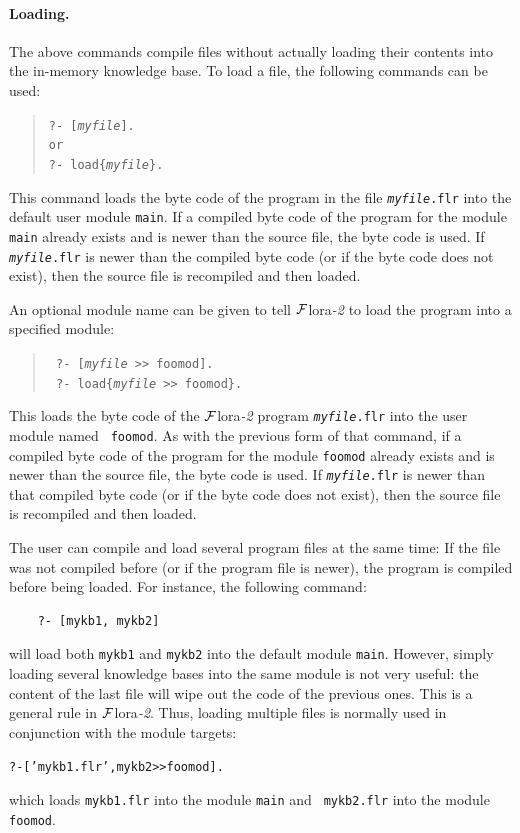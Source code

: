 \documentclass[11pt]{article}
\newcommand{\FLORA}{{\mbox{\sc ${\cal F}${lora}\rm\emph{-2}}}\xspace}
\newcommand{\FLSYSTEM}{\FLORA}
\newcommand{\flrext}{flr\xspace}
\begin{document}
\paragraph{Loading.}
%
The above commands compile files without actually loading their contents
into the in-memory knowledge base. 
To load a file, the following commands can be used:
\index{\tt [file]}
\begin{quote}
 \tt ?- [\textit{myfile}].  
 \\
 or
 \\
 \tt ?- load\{\textit{myfile}\}.
\end{quote}
This command loads the byte code of the program in the file {\tt \textit{myfile}.\flrext} into the default user
module {\tt main}. If a compiled byte code of the program for the module
{\tt main} already exists and is newer than the source file, the byte code
is used.  If {\tt \textit{myfile}.\flrext} is newer than the compiled byte code (or if
the byte code does not exist), then
the source file is recompiled and then loaded.

An optional module name can be given to tell \FLSYSTEM to
load the program into a specified module:
\begin{quote}
  \tt
    ?- [\textit{myfile} >{}> foomod].\\
    \tt
    ?- load\{\textit{myfile} >{}> foomod\}.
\end{quote}
This loads the byte code of the \FLSYSTEM program {\tt \textit{myfile}.\flrext} into the user module named {\tt
  foomod}. As with the previous form of that command, if a compiled byte code of the program for the module
{\tt foomod} already exists and is newer than the source file, the byte code
is used.  If {\tt \textit{myfile}.\flrext} is newer than that compiled byte code (or if
the byte code does not exist), then
the source file is recompiled and then loaded.

The user can compile and load several program
files at the same time: If the file was not compiled before (or if the
program file is newer), the program is compiled before being loaded.
For instance, the following command:
\begin{verbatim}
    ?- [mykb1, mykb2]
\end{verbatim}
will load both {\tt mykb1} and {\tt mykb2} into the default module
{\tt main}. However, simply loading several knowledge bases into the same module is not
very useful: the content of the last file will wipe out the code of the
previous ones. This is a general rule in \FLSYSTEM. Thus, loading
multiple files is normally used in conjunction with the module targets:
\begin{alltt}
    ?- ['mykb1.\flrext', mykb2 >{}> foomod].
\end{alltt}
which loads {\tt mykb1.\flrext} into the module {\tt main} and {\tt
  mykb2.\flrext} into the module {\tt foomod}.
\end{document}
